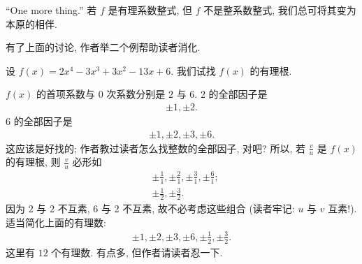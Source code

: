 ``One more thing.'' 若 $f$ 是有理系数整式, 但 $f$ 不是整系数整式, 我们总可将其变为本原的相伴.

有了上面的讨论, 作者举二个例帮助读者消化.

\begin{example}
    设 $f(x) = 2 x^4-3 x^3+3 x^2-13 x+6$. 我们试找 $f(x)$ 的有理根.

    $f(x)$ 的首项系数与 $0$ 次系数分别是 $2$ 与 $6$. $2$ 的全部因子是
    \begin{align*}
        \pm 1, \pm 2.
    \end{align*}
    $6$ 的全部因子是
    \begin{align*}
        \pm 1, \pm 2, \pm 3, \pm 6.
    \end{align*}
    这应该是好找的; 作者教过读者怎么找整数的全部因子, 对吧? 所以, 若 $\frac{v}{u}$ 是 $f(x)$ 的有理根, 则 $\frac{v}{u}$ 必形如
    \begin{align*}
         & {\pm \frac{1}{1}}, {\pm \frac{2}{1}}, {\pm \frac{3}{1}}, {\pm \frac{6}{1}}; \\
         & {\pm \frac{1}{2}}, {\pm \frac{3}{2}}.
    \end{align*}
    因为 $2$ 与 $2$ 不互素, $6$ 与 $2$ 不互素, 故不必考虑这些组合 (读者牢记: $u$ 与 $v$ 互素!). 适当简化上面的有理数:
    \begin{align*}
        \pm 1, \pm 2, \pm 3, \pm 6, \pm \frac{1}{2}, \pm \frac{3}{2}.
    \end{align*}
    这里有 $12$ 个有理数. 有点多, 但作者请读者忍一下.


\end{example}
